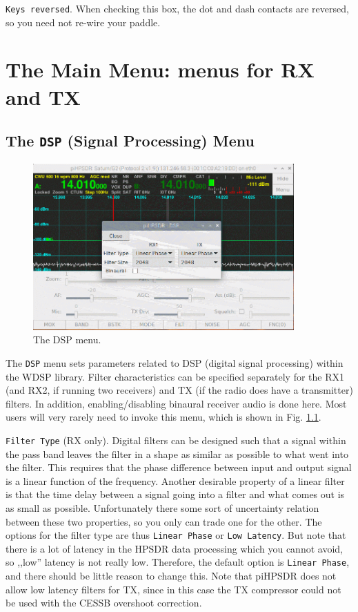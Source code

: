 \documentclass[12pt]{book}
\def\rett#1{\texttt{\color{red}#1}}
\def\bltt#1{\texttt{\color{blue}#1}}
\def\pH{pi\-HPSDR\xspace}
\begin{document}
\rett{Keys reversed}. When checking this box, the dot and dash contacts
are reversed, so you need not re-wire your paddle.


\chapter[Menus for RX and TX]{The Main Menu: menus for RX and TX}

\section{The \texttt{DSP} (Signal Processing) Menu}

\begin{figure}[ht]
\center
\includegraphics[width=10cm]{DSPMenu.png}
\caption{The DSP menu.}
\label{fig:DSPMenu}
\end{figure}

The \bltt{DSP} menu sets parameters related to DSP (digital signal processing)
within the WDSP library.
Filter characteristics can be specified separately for the RX1 (and RX2, if
running two receivers) and TX (if the radio does have a transmitter)
filters. In addition, enabling/disabling binaural receiver audio
is done here.  Most users will
very rarely need to invoke this menu, which is shown
in Fig. \ref{fig:DSPMenu}.

\rett{Filter Type} (RX only). Digital filters can be designed such that a signal within the
pass band leaves the filter in a shape as similar as possible
to what went into the filter. This requires that the phase
difference between input and output signal is a linear
function of the frequency. Another desirable property
of a linear filter is that the time delay between a signal
going into a filter and what comes out is as small as
possible. Unfortunately there some sort of uncertainty
relation between these two properties, so you only can
trade one for the other. The options for the filter type
are thus \rett{Linear Phase} or \rett{Low Latency}.
But note that there is a lot of latency in the HPSDR data
processing which you cannot avoid, so ,,low'' latency
is not really low. Therefore, the default option
is \rett{Linear Phase}, and there should be little reason
to change this. Note that \pH does not allow low latency
filters for TX, since in this case the TX compressor
could not be used with the CESSB overshoot correction.
\end{document}
